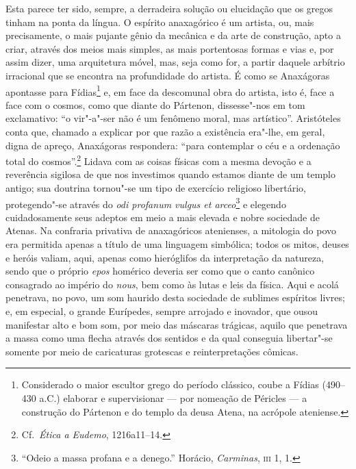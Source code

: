  Esta parece ter sido, sempre, a derradeira solução ou elucidação que os
 gregos tinham na ponta da língua. O espírito anaxagórico é um artista, ou,
 mais precisamente, o mais pujante gênio da mecânica e da arte de construção,
 apto a criar, através dos meios mais simples, as mais portentosas formas e
 vias e, por assim dizer, uma arquitetura móvel, mas, seja como for, a partir
 daquele arbítrio irracional que se encontra na profundidade do artista. É
 como se Anaxágoras apontasse para Fídias\footnote{ Considerado o maior
 escultor grego do período clássico, coube a Fídias (490--430 a.C.) elaborar
 e supervisionar --- por nomeação de Péricles --- a construção do Pártenon e do
 templo da deusa Atena, na acrópole ateniense.} e, em face da descomunal obra
 do artista, isto é, face a face com o cosmos, como que diante do Pártenon,
 dissesse"-nos em tom exclamativo: ``o vir"-a"-ser não é um fenômeno moral,
 mas artístico''. Aristóteles conta que, chamado a explicar por que razão a
 existência era"-lhe, em geral, digna de apreço, Anaxágoras respondera:
 ``para contemplar o céu e a ordenação total do cosmos''.\footnote
 { Cf.~\textit{Ética a Eudemo}, 1216a11--14.} Lidava com as coisas físicas
 com a mesma devoção e a reverência sigilosa de que nos investimos quando
 estamos diante de um templo antigo; sua doutrina tornou"-se um tipo de
 exercício religioso libertário, protegendo"-se através do \textit{odi profanum 
 vulgus et arceo}\footnote{ ``Odeio a massa profana e a
 denego.'' Horácio, \textit{Carminas}, \textsc{iii} 1, 1.} e elegendo 
 cuidadosamente seus adeptos em meio a mais elevada e nobre sociedade de 
 Atenas. Na confraria privativa
 de anaxagóricos atenienses, a mitologia do povo era permitida apenas a
 título de uma linguagem simbólica; todos os mitos, deuses e heróis valiam,
 aqui, apenas como hieróglifos da interpretação da natureza, sendo que o
 próprio \textit{epos} homérico deveria ser como que o canto canônico
 consagrado ao império do \textit{nous}, bem como às lutas e leis da física.
 Aqui e acolá penetrava, no povo, um som haurido desta sociedade de sublimes
 espíritos livres; e, em especial, o grande Eurípedes, sempre arrojado e
 inovador, que ousou manifestar alto e bom som, por meio das máscaras
 trágicas, aquilo que penetrava a massa como uma flecha através dos sentidos
 e da qual conseguia libertar"-se somente por meio de caricaturas grotescas e
 reinterpretações cômicas.

